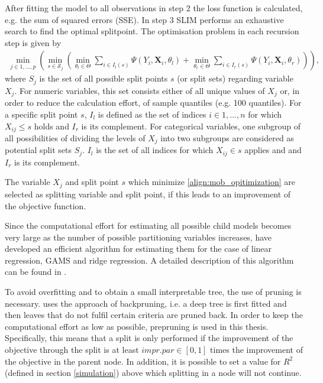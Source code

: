 After fitting the model to all observations in step 2 the  loss function is calculated, e.g. the sum of squared errors (SSE).
In step 3 SLIM performs an exhaustive search to find the optimal splitpoint.  
The optimisation problem in each recursion step is given by \begin{align} \label{align:mob_opitimization}
    \min_{j \in 1,..., p} \left( \min_{s \in \mathcal{S}_j} \left(\min_{\theta_{l} \in \Theta}\sum_{i \in I_{l}(s)}\Psi(Y_{i}, \mathbf{X}_{i}, \theta_{l})  +  \min_{\theta_{r} \in \Theta}\sum_{i \in I_{r}(s)}\Psi(Y_{i}, \mathbf{X}_{i}, \theta_{r}) \right) \right),
\end{align}
where ${S}_j$ is the set of all possible split points $s$ (or split sets) regarding variable $X_j$. For numeric variables, this set consists either of all unique values of $X_j$ or, in order to reduce the calculation effort, of sample quantiles (e.g. 100 quantiles). For a specific split point $s$, $I_{l}$ is defined as the set of indices $i \in 1,...,n$ for which $X_{ij} \leq s$ holds and $I_{r}$ is its complement. For categorical variables, one subgroup of all possibilities of dividing the levels of $X_{j}$ into two subgroups are considered as potential split sets $S_j$. $I_l$ is  the set of all indices for which $X_{ij} \in s$ applies and and $I_{r}$ is its complement.

The variable $X_j$ and split point $s$ which minimize  \ref{align:mob_opitimization} are selected as splitting variable and split point, if this leads to an improvement of the objective function.

Since the computational effort for estimating all possible child models becomes very large as the number of possible partitioning variables increases, \citep{Hu.2020} have developed an efficient algorithm for estimating them for the case of linear regression, GAMS and ridge regression. A detailed description of this algorithm can be found in \citep{Hu.2020}.

To avoid overfitting and to obtain a small interpretable tree, the use of pruning is necessary. \citep{Hu.2020} uses the approach of backpruning, i.e. a deep tree is first fitted and then leaves that do not fulfil certain criteria are pruned back. 
In order to keep the computational effort as low as possible, prepruning is used in this thesis. Specifically, this means that a split is only performed if the improvement of the objective through the split is at least $impr.par \in [0,1]$ times the improvement of the objective in the parent node. In addition, it is possible to set a value for $R^2$ (defined in section \ref{simulation}) above which splitting in a node will not continue.










